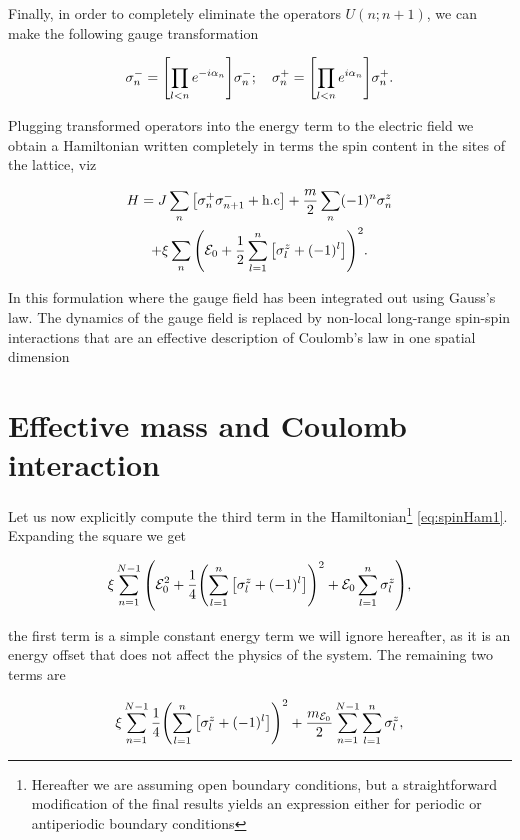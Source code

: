 Finally, in order to completely eliminate the operators $U(n;n+1)$, we can make the following gauge transformation

\begin{equation}
\sigma^-_n = \qty[\prod_{l<n}e^{-i\alpha_n}]\sigma^-_n;\quad \sigma^+_n = \qty[\prod_{l<n}e^{i\alpha_n}]\sigma^+_n.
\end{equation}

Plugging transformed operators into the energy term to the electric field we obtain a Hamiltonian written completely in terms the spin content in the sites of the lattice, viz 

\begin{multline}
	H = J\sum_n\qty[\sigma^+_n \sigma^-_{n+1} + \text{h.c}] + \frac{m}{2}\sum_n (-1)^n\sigma^z_n \\
	+ \xi \sum_n \qty(\mathcal{E}_0 + \frac{1}{2}\sum_{l=1}^{n}\qty[\sigma^z_l + (-1)^l])^2.\label{eq:spinHam1}
\end{multline}

In this formulation where the gauge field has been integrated out using Gauss's law. The dynamics of the gauge field is replaced by non-local long-range spin-spin interactions that are an effective description of Coulomb's law in one spatial dimension \cite{Hamer1997}

\section{Effective mass and Coulomb interaction}\label{sec:Coulomb}

Let us now explicitly compute the third term in the Hamiltonian\footnote{Hereafter we are assuming open boundary conditions, but a straightforward modification of the final results yields an expression either for periodic or antiperiodic boundary conditions} \eqref{eq:spinHam1}. Expanding the square we get 

\begin{equation}
\xi \sum_{n=1}^{N-1} \qty(\mathcal{E}_0^2 + \frac{1}{4}\qty(\sum_{l=1}^{n}\qty[\sigma^z_l + (-1)^l])^2 + \mathcal{E}_0\sum_{l=1}^{n}\sigma^z_l),
\end{equation}

the first term is a simple constant energy term we will ignore hereafter, as it is an energy offset that does not affect the physics of the system. The remaining two terms are

\begin{equation}
\xi \sum_{n=1}^{N-1}\frac{1}{4}\qty(\sum_{l=1}^{n}\qty[\sigma^z_l + (-1)^l])^2 + \frac{m_{\mathcal{E}_0}}{2} \sum_{n=1}^{N-1}\sum_{l=1}^{n}\sigma^z_l\label{eq:spinInt},
\end{equation}

